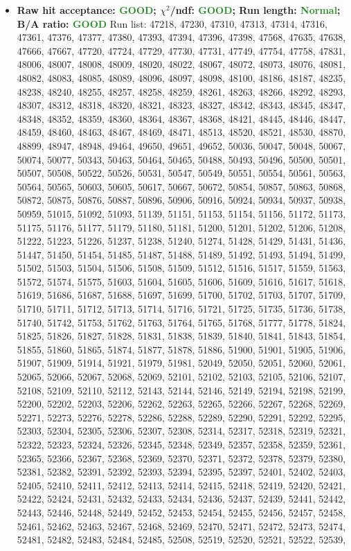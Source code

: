 \documentclass{article}
\begin{document}
\begin{itemize}
\item \textbf{Raw hit acceptance: \textcolor{ForestGreen}{GOOD}; $\chi^{2}$/ndf: \textcolor{ForestGreen}{GOOD}; Run length: \textcolor{ForestGreen}{Normal}; B/A ratio: \textcolor{ForestGreen}{GOOD}} \newline
Run list: 47218, 47230, 47310, 47313, 47314, 47316, 47361, 47376, 47377, 47380, 47393, 47394, 47396, 47398, 47568, 47635, 47638, 47666, 47667, 47720, 47724, 47729, 47730, 47731, 47749, 47754, 47758, 47831, 48006, 48007, 48008, 48009, 48020, 48022, 48067, 48072, 48073, 48076, 48081, 48082, 48083, 48085, 48089, 48096, 48097, 48098, 48100, 48186, 48187, 48235, 48238, 48240, 48255, 48257, 48258, 48259, 48261, 48263, 48266, 48292, 48293, 48307, 48312, 48318, 48320, 48321, 48323, 48327, 48342, 48343, 48345, 48347, 48348, 48352, 48359, 48360, 48364, 48367, 48368, 48421, 48445, 48446, 48447, 48459, 48460, 48463, 48467, 48469, 48471, 48513, 48520, 48521, 48530, 48870, 48899, 48947, 48948, 49464, 49650, 49651, 49652, 50036, 50047, 50048, 50067, 50074, 50077, 50343, 50463, 50464, 50465, 50488, 50493, 50496, 50500, 50501, 50507, 50508, 50522, 50526, 50531, 50547, 50549, 50551, 50554, 50561, 50563, 50564, 50565, 50603, 50605, 50617, 50667, 50672, 50854, 50857, 50863, 50868, 50872, 50875, 50876, 50887, 50896, 50906, 50916, 50924, 50934, 50937, 50938, 50959, 51015, 51092, 51093, 51139, 51151, 51153, 51154, 51156, 51172, 51173, 51175, 51176, 51177, 51179, 51180, 51181, 51200, 51201, 51202, 51206, 51208, 51222, 51223, 51226, 51237, 51238, 51240, 51274, 51428, 51429, 51431, 51436, 51447, 51450, 51454, 51485, 51487, 51488, 51489, 51492, 51493, 51494, 51499, 51502, 51503, 51504, 51506, 51508, 51509, 51512, 51516, 51517, 51559, 51563, 51572, 51574, 51575, 51603, 51604, 51605, 51606, 51609, 51616, 51617, 51618, 51619, 51686, 51687, 51688, 51697, 51699, 51700, 51702, 51703, 51707, 51709, 51710, 51711, 51712, 51713, 51714, 51716, 51721, 51725, 51735, 51736, 51738, 51740, 51742, 51753, 51762, 51763, 51764, 51765, 51768, 51777, 51778, 51824, 51825, 51826, 51827, 51828, 51831, 51838, 51839, 51840, 51841, 51843, 51854, 51855, 51860, 51865, 51874, 51877, 51878, 51886, 51900, 51901, 51905, 51906, 51907, 51909, 51914, 51921, 51979, 51981, 52049, 52050, 52051, 52060, 52061, 52065, 52066, 52067, 52068, 52069, 52101, 52102, 52103, 52105, 52106, 52107, 52108, 52109, 52110, 52112, 52143, 52144, 52146, 52149, 52194, 52198, 52199, 52200, 52202, 52203, 52206, 52262, 52263, 52265, 52266, 52267, 52268, 52269, 52271, 52273, 52276, 52278, 52286, 52288, 52289, 52290, 52291, 52292, 52295, 52303, 52304, 52305, 52306, 52307, 52308, 52314, 52317, 52318, 52319, 52321, 52322, 52323, 52324, 52326, 52345, 52348, 52349, 52357, 52358, 52359, 52361, 52365, 52366, 52367, 52368, 52369, 52370, 52371, 52372, 52378, 52379, 52380, 52381, 52382, 52391, 52392, 52393, 52394, 52395, 52397, 52401, 52402, 52403, 52405, 52410, 52411, 52412, 52413, 52414, 52415, 52418, 52419, 52420, 52421, 52422, 52424, 52431, 52432, 52433, 52434, 52436, 52437, 52439, 52441, 52442, 52443, 52446, 52448, 52449, 52452, 52453, 52454, 52455, 52456, 52457, 52458, 52461, 52462, 52463, 52467, 52468, 52469, 52470, 52471, 52472, 52473, 52474, 52481, 52482, 52483, 52484, 52485, 52508, 52519, 52520, 52521, 52522, 52539, 
\end{itemize}
\end{document}
